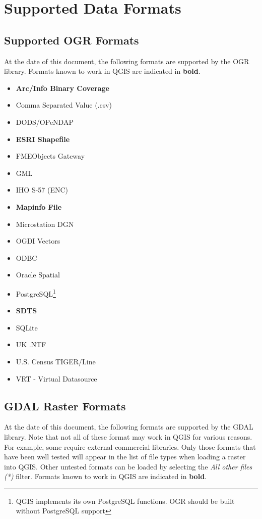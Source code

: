 \section{Supported Data Formats}\label{appdx_data_formats}

\updatedisclaimer

\subsection{Supported OGR Formats}\label{appdx_ogr}

At the date of this document, the following formats are supported by the OGR
library. Formats known to work in QGIS are indicated in \textbf{bold}.

\begin{itemize}
\item \textbf{Arc/Info Binary Coverage}
\item Comma Separated Value (.csv) 
\item DODS/OPeNDAP
\item \textbf{ESRI Shapefile}
\item FMEObjects Gateway
\item GML
\item IHO S-57 (ENC)
\item \textbf{Mapinfo File}
\item Microstation DGN
\item OGDI Vectors
\item ODBC
\item Oracle Spatial
\item PostgreSQL\footnote{QGIS implements its own PostgreSQL functions. OGR
should be built without PostgreSQL support}
\item \textbf{SDTS}
\item SQLite
\item UK .NTF
\item U.S. Census TIGER/Line
\item VRT - Virtual Datasource
\end{itemize}

\subsection{GDAL Raster Formats}\label{appdx_gdal}

At the date of this document, the following formats are supported by the GDAL
library. Note that not all of these format may work in QGIS for various
reasons.
For example, some require external commercial libraries. Only those formats
that
have been well tested will appear in the list of file types when loading a
raster into QGIS. Other untested formats can be loaded by selecting the
\textsl{All other files (*)} filter. Formats known to work in QGIS are
indicated
in \textbf{bold}.

